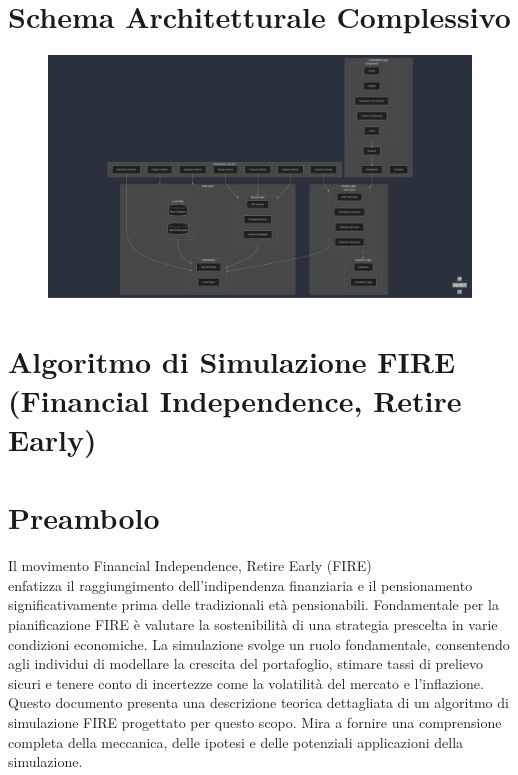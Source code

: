 \documentclass{article}
\begin{document}
\section{Schema Architetturale
Complessivo}\label{sec:schema-architetturale-complessivo}
\begin{figure}[H]
    \centering
    \includegraphics[width=1\textwidth]{foto/architecture}
    \caption{}
    \label{fig:architecture}
\end{figure}

\section*{Algoritmo di Simulazione FIRE (Financial Independence, Retire Early)}
   
    \section{Preambolo}\label{sec:preambolo2}

Il movimento Financial Independence, Retire Early (FIRE) \\ enfatizza il
    raggiungimento dell'indipendenza finanziaria e il pensionamento
    significativamente prima delle tradizionali età pensionabili.
    Fondamentale
    per la pianificazione FIRE è valutare la sostenibilità di una strategia
    prescelta in varie condizioni economiche.
    La simulazione svolge un ruolo
    fondamentale, consentendo agli individui di modellare la crescita del
    portafoglio, stimare tassi di prelievo sicuri e tenere conto di incertezze
    come la volatilità del mercato e l'inflazione.
    Questo documento presenta una
    descrizione teorica dettagliata di un algoritmo di simulazione FIRE
    progettato per questo scopo.
    Mira a fornire una comprensione completa della
    meccanica, delle ipotesi e delle potenziali applicazioni della simulazione.
\end{document}
